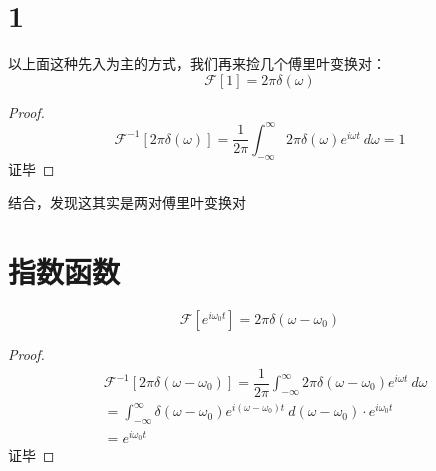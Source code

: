     \section{1}
        以上面这种先入为主的方式，我们再来捡几个傅里叶变换对：
        \begin{equation}
            \mathscr{F}[1]=2\pi\delta(\omega)
            \label{eq: 2.17}
        \end{equation}
        \begin{proof}
            \begin{equation*}
                \mathscr{F}^{-1}[2\pi\delta(\omega)]=\dfrac{1}{2\pi}\int_{-\infty}^{\infty}2\pi\delta(\omega)e^{i\omega t}\ d\omega=1\tag*{}
            \end{equation*}
            证毕
        \end{proof}

        结合，发现这其实是两对傅里叶变换对
    \section{指数函数}
        \begin{equation}
            \mathscr{F}[e^{i\omega_0 t}]=2\pi\delta(\omega-\omega_0)
            \label{eq: 2.18}
        \end{equation}
        \begin{proof}
            \begin{equation*}
                \begin{split}
                    &\mathscr{F}^{-1}[2\pi\delta(\omega-\omega_0)]=\dfrac{1}{2\pi}\int_{-\infty}^{\infty}2\pi\delta(\omega-\omega_0)e^{i\omega t}\ d\omega\\
                    &=\int_{-\infty}^{\infty}\delta(\omega-\omega_0)e^{i(\omega-\omega_0) t}\ d(\omega-\omega_0)\cdot e^{i\omega_0 t}\\
                    &=e^{i\omega_0 t}
                \end{split}
            \end{equation*}
            证毕
        \end{proof}

